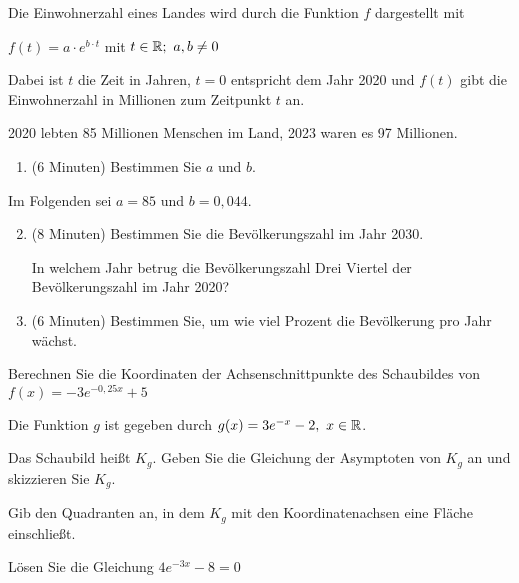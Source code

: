 \begin{Exercise}[title={Zeitansatz 20 min, mit Taschenrechner}, label=eFktVA_3]%

    Die Einwohnerzahl eines Landes wird durch die Funktion \(f\) dargestellt mit

    \(f(t)=a\cdot e^{b\cdot t}\) mit \(t\in\mathbb{R};\ a,b\neq0\)

    Dabei ist \(t\) die Zeit in Jahren, \(t=0\) entspricht dem Jahr 2020 und \(f(t)\) gibt die Einwohnerzahl in Millionen zum Zeitpunkt \(t\) an.

    2020 lebten 85 Millionen Menschen im Land, 2023 waren es 97 Millionen.

    \begin{enumerate}[label=\alph*)]
        \item (6 Minuten) Bestimmen Sie \(a\) und \(b\).
    \end{enumerate}

    Im Folgenden sei \(a=85\) und \(b=0,044\).

    \begin{enumerate}[label=\alph*)]
        \setcounter{enumi}{1}
        \item (8 Minuten) Bestimmen Sie die Bevölkerungszahl im Jahr 2030.

        In welchem Jahr betrug die Bevölkerungszahl Drei Viertel der Bevölkerungszahl im Jahr 2020?
        \item (6 Minuten) Bestimmen Sie, um wie viel Prozent die Bevölkerung pro Jahr wächst.
    \end{enumerate}
\end{Exercise}
\begin{Exercise}[title={Zeitansatz 6 min, mit Taschenrechner}, label=eFktVA_4]%

    Berechnen Sie die Koordinaten der Achsenschnittpunkte des Schaubildes von \(f(x)=-3e^{-0,25x}+5\)
\end{Exercise}
\begin{Exercise}[title={Zeitansatz 10 min, ohne Taschenrechner}, label=eFktVA_5]%

    Die Funktion \(g\) ist gegeben durch \(g(x)=3e^{-x}-2,\ x\in\R\).

    Das Schaubild heißt \(K_g\). Geben Sie die Gleichung der Asymptoten von \(K_g\) an und skizzieren Sie \(K_g\).

    Gib den Quadranten an, in dem \(K_g\) mit den Koordinatenachsen eine Fläche einschließt.
\end{Exercise}
\begin{Exercise}[title={Zeitansatz 6 min, ohne Taschenrechner}, label=eFktVA_6]%

    Lösen Sie die Gleichung \(4e^{-3x}-8=0\)
\end{Exercise}
